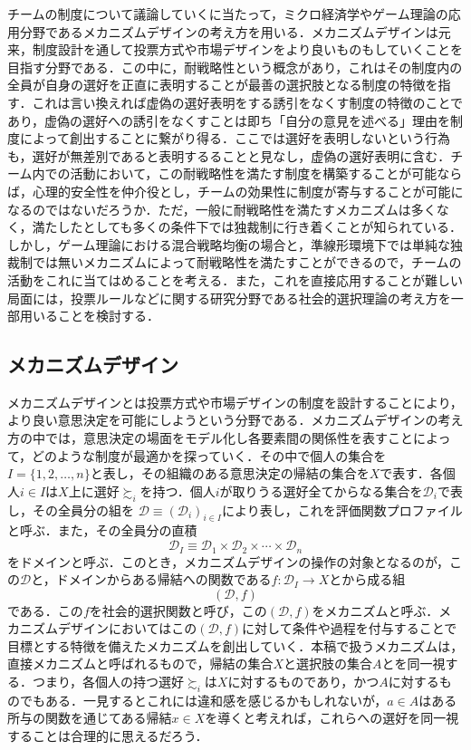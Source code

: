 \documentclass[a4paper, 11pt]{jsarticle}
\begin{document}
チームの制度について議論していくに当たって，ミクロ経済学やゲーム理論の応用分野であるメカニズムデザインの考え方を用いる．メカニズムデザインは元来，制度設計を通して投票方式や市場デザインをより良いものもしていくことを目指す分野である．この中に，耐戦略性という概念があり，これはその制度内の全員が自身の選好を正直に表明することが最善の選択肢となる制度の特徴を指す．これは言い換えれば虚偽の選好表明をする誘引をなくす制度の特徴のことであり，虚偽の選好への誘引をなくすことは即ち「自分の意見を述べる」理由を制度によって創出することに繋がり得る．ここでは選好を表明しないという行為も，選好が無差別であると表明するることと見なし，虚偽の選好表明に含む．チーム内での活動において，この耐戦略性を満たす制度を構築することが可能ならば，心理的安全性を仲介役とし，チームの効果性に制度が寄与することが可能になるのではないだろうか．ただ，一般に耐戦略性を満たすメカニズムは多くなく，満たしたとしても多くの条件下では独裁制に行き着くことが知られている．しかし，ゲーム理論における混合戦略均衡の場合と，準線形環境下では単純な独裁制では無いメカニズムによって耐戦略性を満たすことができるので，チームの活動をこれに当てはめることを考える．また，これを直接応用することが難しい局面には，投票ルールなどに関する研究分野である社会的選択理論の考え方を一部用いることを検討する．

\subsection{メカニズムデザイン}
メカニズムデザインとは投票方式や市場デザインの制度を設計することにより，より良い意思決定を可能にしようという分野である．メカニズムデザインの考え方の中では，意思決定の場面をモデル化し各要素間の関係性を表すことによって，どのような制度が最適かを探っていく．その中で個人の集合を\(I = \{1,2,\dots,n\}\)と表し，その組織のある意思決定の帰結の集合を\(X\)で表す．各個人\(i \in I\)は\(X\)上に選好\(\succsim_i\)を持つ．個人\(i\)が取りうる選好全てからなる集合を\(\mathscr{D}_i\)で表し，その全員分の組を
\(\mathscr{D} \equiv (\mathscr{D}_i)_{i \in I}\)により表し，これを評価関数プロファイルと呼ぶ．また，その全員分の直積
\[\mathscr{D}_I \equiv \mathscr{D}_1 \times \mathscr{D}_2 \times \cdots \times \mathscr{D}_n\]
をドメインと呼ぶ．このとき，メカニズムデザインの操作の対象となるのが，この\(\mathscr{D}\)と，ドメインからある帰結への関数である\(f: \mathscr{D}_I \rightarrow X\)とから成る組\[(\mathscr{D}, f)\]である．この\(f\)を社会的選択関数と呼び，この\((\mathscr{D}, f)\)をメカニズムと呼ぶ．メカニズムデザインにおいてはこの\((\mathscr{D}, f)\)に対して条件や過程を付与することで目標とする特徴を備えたメカニズムを創出していく．本稿で扱うメカニズムは，直接メカニズムと呼ばれるもので，帰結の集合\(X\)と選択肢の集合\(A\)とを同一視する．つまり，各個人の持つ選好\(\succsim_i\)は\(X\)に対するものであり，かつ\(A\)に対するものでもある．一見するとこれには違和感を感じるかもしれないが，\(a \in A\)はある所与の関数を通じてある帰結\(x \in X\)を導くと考えれば，これらへの選好を同一視することは合理的に思えるだろう．
\end{document}
